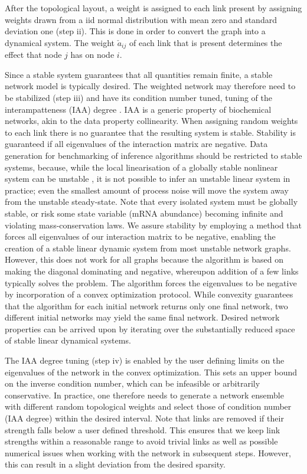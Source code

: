After the topological layout, a weight is assigned to each link present by assigning weights drawn from a iid normal distribution with mean zero and standard deviation one (step ii).
This is done in order to convert the graph into a dynamical system. The weight \(\check{a}_{ij}\) of each link that is present determines the effect that node \(j\) has on node \(i\).

Since a stable system guarantees that all quantities remain finite, a stable network model is typically desired. The weighted network may therefore need to be stabilized (step iii) and have its condition number tuned, \ie tuning of the interampatteness (IAA) degree \citep{Nordling2009}. IAA is a generic property of biochemical networks, akin to the data property collinearity.%
When assigning random weights to each link there is no guarantee that the resulting system is stable. Stability is guaranteed if all eigenvalues of the interaction matrix are negative. 
Data generation for benchmarking of inference algorithms should be restricted to stable systems, because, while the local linearisation of a globally stable nonlinear system can be unstable \citep{Khalil1996}, it is not possible to infer an unstable linear system in practice; even the smallest amount of process noise will move the system away from the unstable steady-state.
Note that every isolated system must be globally stable, or risk some state variable (mRNA abundance) becoming infinite and violating mass-conservation laws.
We assure stability by employing a method that forces all eigenvalues of our interaction matrix to be negative\citep{Zavlanos2011}, enabling the creation of a stable linear dynamic system from most unstable network graphs.
However, this does not work for all graphs because the algorithm is based on making the diagonal dominating and negative, whereupon addition of a few links typically solves the problem.
The algorithm forces the eigenvalues to be negative by incorporation of a convex optimization protocol\citep{grant2008cvx}. While  convexity guarantees that the algorithm for each initial network returns only one final network, two different initial networks may yield the same final network.
Desired network properties can be arrived upon by iterating over the substantially reduced space of stable linear dynamical systems.%

The IAA degree tuning (step iv) is enabled by the user defining limits on the eigenvalues of the network in the convex optimization.
This sets an upper bound on the inverse condition number, which can be infeasible or arbitrarily conservative.
In practice, one therefore needs to generate a network ensemble with different random topological weights and select those of condition number (IAA degree) within the desired interval. Note that links are removed if their strength falls below a user defined threshold.
This ensures that we keep link strengths within a reasonable range to avoid trivial links as well as possible numerical issues when working with the network in subsequent steps.
However, this can result in a slight deviation from the desired sparsity.

